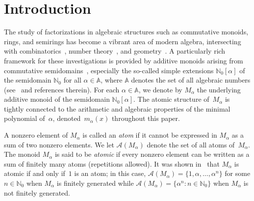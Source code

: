 \documentclass[11pt]{amsart}
\theoremstyle{definition}
\theoremstyle{remark}
\numberwithin{equation}{section}
\newcommand{\aaa}{\mathbb{A}}
\newcommand{\nn}{\mathbb{N}}
\begin{document}
\bigskip
\maketitle


\bigskip
\section{Introduction}
\label{sec:intro}

The study of factorizations in algebraic structures such as commutative monoids, rings, and semirings has become a vibrant area of modern algebra, intersecting with combinatorics~\cite{AGL24}, number theory~\cite{GK24}, and geometry~\cite{dG22}. A particularly rich framework for these investigations is provided by additive monoids arising from commutative semidomains~\cite{CGG20}, especially the so-called simple extensions $\mathbb{N}_0[\alpha]$ of the semidomain $\nn_0$ for all $\alpha \in \aaa$, where $\aaa$ denotes the set of all algebraic numbers (see~\cite{ABLST23,CG22} and references therein). For each $\alpha \in \aaa$, we denote by $M_\alpha$ the underlying additive monoid of the semidomain $\nn_0[\alpha]$. The atomic structure of~$M_\alpha$ is tightly connected to the arithmetic and algebraic properties of the minimal polynomial of~$\alpha$, denoted~$m_\alpha(x)$ throughout this paper.

\smallskip

A nonzero element of $M_\alpha$ is called an \emph{atom} if it cannot be expressed in $M_\alpha$ as a sum of two nonzero elements. We let $\mathcal{A}(M_\alpha)$ denote the set of all atoms of~$M_\alpha$. The monoid $M_\alpha$ is said to be \emph{atomic} if every nonzero element can be written as a sum of finitely many atoms (repetitions allowed). It was shown in~\cite[Theorem~4.2]{CG22} that $M_\alpha$ is atomic if and only if~$1$ is an atom; in this case, $\mathcal{A}(M_\alpha) = \{1, \alpha, \dots, \alpha^n \}$ for some $n \in \nn_0$ when $M_\alpha$ is finitely generated while $\mathcal{A}(M_\alpha) = \{\alpha^n : n \in \nn_0\}$ when $M_\alpha$ is not finitely generated.

\smallskip
\end{document}
